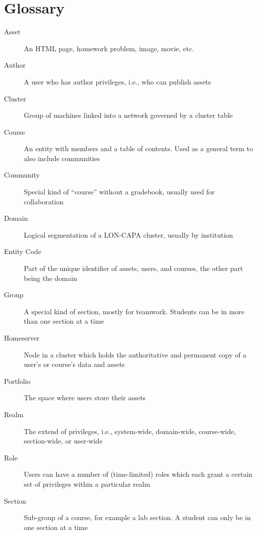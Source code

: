 \chapter{Glossary}
\begin{description}
\item[Asset] An HTML page, homework problem, image, movie, etc.
\item[Author] A user who has author privileges, i.e., who can publish assets
\item[Cluster] Group of machines linked into a network governed by a cluster table
\item[Course] An entity with members and a table of contents. Used as a general term to also include communities
\item[Community] Special kind of ``course'' without a gradebook, usually used for collaboration
\item[Domain] Logical segmentation of a LON-CAPA cluster, usually by institution
\item[Entity Code] Part of the unique identifier of assets, users, and courses, the other part being the domain
\item[Group] A special kind of section, mostly for teamwork. Students can be in more than one section at a time
\item[Homeserver] Node in a cluster which holds the authoritative and permanent copy of a user's or course's data and assets
\item[Portfolio] The space where users store their assets
\item[Realm] The extend of privileges, i.e., system-wide, domain-wide, course-wide, section-wide, or user-wide
\item[Role] Users can have a number of (time-limited) roles which each grant a certain set of privileges within a particular realm
\item[Section] Sub-group of a course, for example a lab section. A student can only be in one section at a time
\end{description} 
